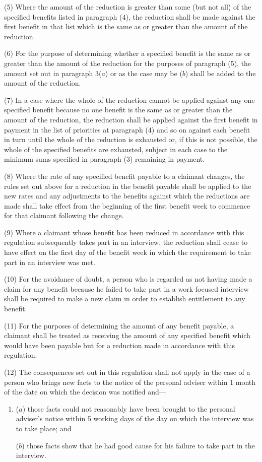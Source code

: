 \documentclass[12pt,a4paper]{article}
\begin{document}
(5) Where the amount of the reduction is greater than some (but not all) of the specified benefits listed in paragraph (4), the reduction shall be made against the first benefit in that list which is the same as or greater than the amount of the reduction.

(6) For the purpose of determining whether a specified benefit is the same as or greater than the amount of the reduction for the purposes of paragraph (5), the amount set out in paragraph 3($a$)  or as the case may be ($b$)  shall be added to the amount of the reduction.

(7) In a case where the whole of the reduction cannot be applied against any one specified benefit because no one benefit is the same as or greater than the amount of the reduction, the reduction shall be applied against the first benefit in payment in the list of priorities at paragraph (4) and so on against each benefit in turn until the whole of the reduction is exhausted or, if this is not possible, the whole of the specified benefits are exhausted, subject in each case to the minimum sums specified in paragraph (3) remaining in payment.

(8) Where the rate of any specified benefit payable to a claimant changes, the rules set out above for a reduction in the benefit payable shall be applied to the new rates and any adjustments to the benefits against which the reductions are made shall take effect from the beginning of the first benefit week to commence for that claimant following the change.

(9) Where a claimant whose benefit has been reduced in accordance with this regulation subsequently takes part in an interview, the reduction shall cease to have effect on the first day of the benefit week in which the requirement to take part in an interview was met.

(10) For the avoidance of doubt, a person who is regarded as not having made a claim for any benefit because he failed to take part in a work-focused interview shall be required to make a new claim in order to establish entitlement to any benefit.

(11) For the purposes of determining the amount of any benefit payable, a claimant shall be treated as receiving the amount of any specified benefit which would have been payable but for a reduction made in accordance with this regulation.

(12) The consequences set out in this regulation shall not apply in the case of a person who brings new facts to the notice of the personal adviser within 1 month of the date on which the decision was notified and—
\begin{enumerate}\item[]
($a$) those facts could not reasonably have been brought to the personal adviser’s notice within 5 working days of the day on which the interview was to take place; and

($b$) those facts show that he had good cause for his failure to take part in the interview.
\end{enumerate}
\end{document}
